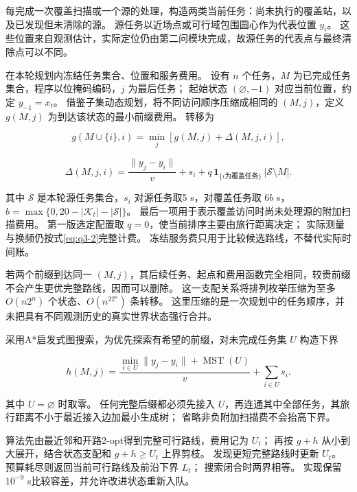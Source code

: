 每完成一次覆盖扫描或一个源的处理，构造两类当前任务：尚未执行的覆盖站，以及已发现但未清除的源。
源任务以近场点或可行域包围圆心作为代表位置 \(y_i\)。
这些位置来自观测估计，实际定位仍由第二问模块完成，故源任务的代表点与最终清除点可以不同。

在本轮规划内冻结任务集合、位置和服务费用。
设有 \(n\) 个任务，\(M\) 为已完成任务集合，程序以位掩码编码，\(j\) 为最后任务；
起始状态 \((\varnothing,-1)\) 对应当前位置，约定 \(y_{-1}=x_t\)。
借鉴子集动态规划\cite{held1962}，将不同访问顺序压缩成相同的 \((M,j)\)，定义 \(g(M,j)\) 为到达该状态的最小前缀费用。
转移为

\begin{equation}\label{eq:q3-8}
g(M\cup\{i\},i)=\min_j\left[g(M,j)+\Delta(M,j,i)\right],
\end{equation}

\begin{equation}\label{eq:q3-9}
\Delta(M,j,i)=\frac{\|y_j-y_i\|}{v}+s_i
+q\,\mathbf1_{\{i\text{为覆盖任务}\}}\,|\mathcal S\setminus M|.
\end{equation}

其中 \(\mathcal S\) 是本轮源任务集合，\(s_i\) 对源任务取5 s，对覆盖任务取 \(6b\) s，\(b=\max\{0,20-|\mathcal K_t|-|\mathcal S|\}\)。
最后一项用于表示覆盖访问时尚未处理源的附加扫描费用。
第一版选定配置取 \(q=0\)，使当前排序主要由旅行距离决定；
实际测量与换频仍按式\eqref{eq:q3-2}完整计费。
冻结服务费只用于比较候选路线，不替代实际时间账。

若两个前缀到达同一 \((M,j)\)，其后续任务、起点和费用函数完全相同，较贵前缀不会产生更优完整路线，因而可以删除。
这一支配关系将排列枚举压缩为至多 \(O(n2^n)\) 个状态、\(O(n^22^n)\) 条转移。
这里压缩的是一次规划中的任务顺序，并未把具有不同观测历史的真实世界状态强行合并。

采用A*启发式图搜索\cite{hart1968}，为优先探索有希望的前缀，对未完成任务集 \(U\) 构造下界

\begin{equation}\label{eq:q3-10}
h(M,j)=\frac{\min_{i\in U}\|y_j-y_i\|+\operatorname{MST}(U)}{v}
+\sum_{i\in U}s_i.
\end{equation}

其中 \(U=\varnothing\) 时取零。
任何完整后缀都必须先接入 \(U\)，再连通其中全部任务，其旅行距离不小于最近接入边加最小生成树；
省略非负附加扫描费不会抬高下界。

算法先由最近邻和开路2-opt得到完整可行路线，费用记为 \(U_t\)；
再按 \(g+h\) 从小到大展开，结合状态支配和 \(g+h\ge U_t\) 上界剪枝。
发现更短完整路线时更新 \(U_t\)。
预算耗尽则返回当前可行路线及前沿下界 \(L_t\)；
搜索闭合时两界相等。
实现保留 \(10^{-9}\) s比较容差，并允许改进状态重新入队。

